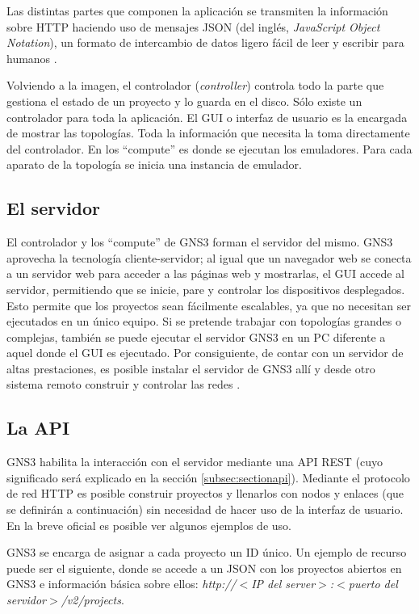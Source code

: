 Las distintas partes que componen la aplicación se transmiten la información sobre HTTP haciendo uso de mensajes JSON (del inglés, \textit{JavaScript Object Notation}), un formato de intercambio de datos ligero fácil de leer y escribir para humanos \cite{JSON}.

Volviendo a la imagen, el controlador (\textit{controller}) controla todo la parte que gestiona el estado de un proyecto y lo guarda en el disco. Sólo existe un controlador para toda la aplicación. El GUI o interfaz de usuario es la encargada de mostrar las topologías. Toda la información que necesita la toma directamente del controlador. En los ``compute'' es donde se ejecutan los emuladores. Para cada aparato de la topología se inicia una instancia de emulador.

\subsection{El servidor}
El controlador y los ``compute'' de GNS3 forman el servidor del mismo. GNS3 aprovecha la tecnología cliente-servidor; al igual que un navegador web se conecta a un servidor web para acceder a las páginas web y mostrarlas, el GUI accede al servidor, permitiendo que se inicie, pare y controlar los dispositivos desplegados. Esto permite que los proyectos sean fácilmente escalables, ya que no necesitan ser ejecutados en un único equipo. Si se pretende trabajar con topologías grandes o complejas, también se puede ejecutar el servidor GNS3 en un PC diferente a aquel donde el GUI es ejecutado. Por consiguiente, de contar con un servidor de altas prestaciones, es posible instalar el servidor de GNS3 allí y desde otro sistema remoto construir y controlar las redes \cite{bookgns}.

\subsection{La API}
GNS3 habilita la interacción con el servidor mediante una API REST (cuyo significado será explicado en la sección \ref{subsec:sectionapi}). Mediante el protocolo de red HTTP es posible construir proyectos y llenarlos con nodos y enlaces (que se definirán a continuación) sin necesidad de hacer uso de la interfaz de usuario. En la breve  oficial es posible ver algunos ejemplos de uso.

GNS3 se encarga de asignar a cada proyecto un ID único. Un ejemplo de recurso puede ser el siguiente, donde se accede a un JSON con los proyectos abiertos en GNS3 e información básica sobre ellos: \textit{http://$<$IP del server$>$:$<$puerto del servidor$>$/v2/projects}.

